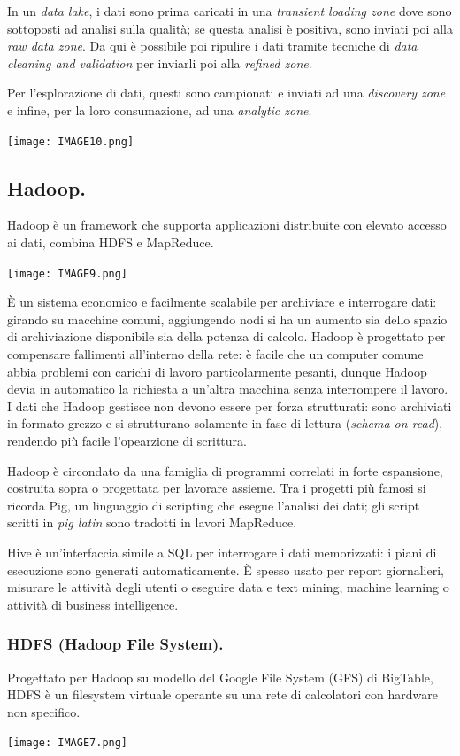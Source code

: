\documentclass[a4page, 11pt]{article}
\begin{document}
In un \textit{data lake}, i dati sono prima caricati in una \textit{transient loading zone} dove sono sottoposti ad analisi sulla qualità; se questa analisi è positiva, sono inviati poi alla \textit{raw data zone}.
Da qui è possibile poi ripulire i dati tramite tecniche di \textit{data cleaning and validation} per inviarli poi alla \textit{refined zone}.

Per l'esplorazione di dati, questi sono campionati e inviati ad una \textit{discovery zone} e infine, per la loro consumazione, ad una \textit{analytic zone}.
\begin{center}
  \texttt{[image: IMAGE10.png]}
\end{center}


\subsection{Hadoop.}
Hadoop è un framework che supporta applicazioni distribuite con elevato accesso ai dati, combina HDFS e MapReduce.
\begin{center}
  \texttt{[image: IMAGE9.png]}
\end{center}
È un sistema economico e facilmente scalabile per archiviare e interrogare dati: girando su macchine comuni, aggiungendo nodi si ha un aumento sia dello spazio di archiviazione disponibile sia della potenza di calcolo.
Hadoop è progettato per compensare fallimenti all'interno della rete: è facile che un computer comune abbia problemi con carichi di lavoro particolarmente pesanti, dunque Hadoop devia in automatico la richiesta a un'altra macchina senza interrompere il lavoro.
I dati che Hadoop gestisce non devono essere per forza strutturati: sono archiviati in formato grezzo e si strutturano solamente in fase di lettura (\textit{schema on read}), rendendo più facile l'opearzione di scrittura.

Hadoop è circondato da una famiglia di programmi correlati in forte espansione, costruita sopra o progettata per lavorare assieme.
Tra i progetti più famosi si ricorda Pig, un linguaggio di scripting che esegue l'analisi dei dati; gli script scritti in \textit{pig latin} sono tradotti in lavori MapReduce.

Hive è un'interfaccia simile a SQL per interrogare i dati memorizzati: i piani di esecuzione sono generati automaticamente.
È spesso usato per report giornalieri, misurare le attività degli utenti o eseguire data e text mining, machine learning o attività di business intelligence.

\subsubsection{HDFS (Hadoop File System).}
Progettato per Hadoop su modello del Google File System (GFS) di BigTable, HDFS è un filesystem virtuale operante su una rete di calcolatori con hardware non specifico.
\begin{center}
  \texttt{[image: IMAGE7.png]}
\end{center}
\end{document}
